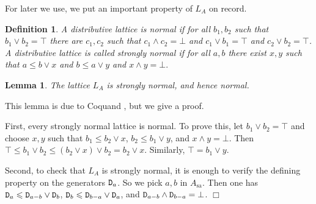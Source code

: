 \documentclass[11pt]{article}
\newcommand{\sa}{\ensuremath{_{\mathrm{sa}}}}
\newcommand{\prop}[1]{\ensuremath{\mbox{\texttt{#1}}}}
\newtheorem{lemma}[theorem]{Lemma}
\newtheorem{definition}[theorem]{Definition}
\newenvironment{proof}[1][Proof]%
{ \begin{trivlist}%
  \item[\hskip \labelsep {\bfseries #1}]%
}%
{ \end{trivlist}%
}
\newcommand{\qed}{\nobreak\hfill$\Box$}
\begin{document}
For later we use, we put an important property of $L_A$ on record.
\begin{definition}\label{defnormal}
  A distributive lattice  is \emph{normal} if for all $b_1, b_2$ such that
  $b_1 \vee b_2 = \top$ there are $c_1, c_2$ such that $c_1 \wedge c_2 = \bot$
  and $c_1 \vee b_1 = \top$ and $c_2 \vee b_2 = \top$. A distributive lattice
is called \emph{strongly normal} if for all $a, b$ there exist $x, y$ such
that $a \leqslant b \vee x$ and $b \leqslant a \vee y$ and $x \wedge y = \bot
.$
\end{definition}
\begin{lemma}
  The lattice $L_A$ is strongly normal, and hence normal.
\end{lemma}
This lemma is due to Coquand \cite[Thm.\ 1.11]{coquand05}, but we give a proof. 
\begin{proof}
First,   every strongly normal lattice is normal.  To prove this,   let $b_1 \vee b_2 = \top$ and choose $x, y$ such that  $b_1 \leqslant b_2 \vee
  x$, $b_2 \leqslant b_1 \vee y$, and $x \wedge y = \bot .$ Then $\top
  \leqslant b_1 \vee b_2 \leqslant (b_2 \vee x) \vee b_2 = b_2 \vee x$.
  Similarly, $\top = b_1 \vee y$.

Second, to check that $L_A$  is strongly normal,  it is enough to verify the defining property on the generators $\prop{D}_a$.
So we pick $a,b$ in $A\sa$. Then one has $\prop{D}_a \leqslant \prop{D}_{a-b} \vee \prop{D}_b$,  $\prop{D}_b \leqslant \prop{D}_{b-a} \vee \prop{D}_a$, 
and  $\prop{D}_{a-b} \wedge \prop{D}_{b-a} = \bot$.
 \qed\end{proof}
\end{document}
